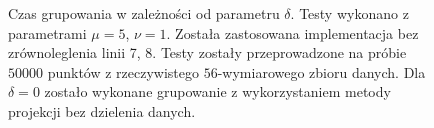 \begin{figure}
	\centering
	\caption{Czas grupowania  w zależności od parametru $ \delta $. Testy wykonano z parametrami $ \mu = 5 $, $ \nu = 1 $. Została zastosowana implementacja bez zrównoleglenia linii 7, 8. Testy zostały przeprowadzone na próbie $ 50000 $ punktów z rzeczywistego $ 56 $-wymiarowego zbioru danych. Dla $ \delta = 0 $ zostało wykonane grupowanie z wykorzystaniem metody projekcji bez dzielenia danych.} 
	\label{fig:qscan-time-by-eps-delta}
\end{figure}